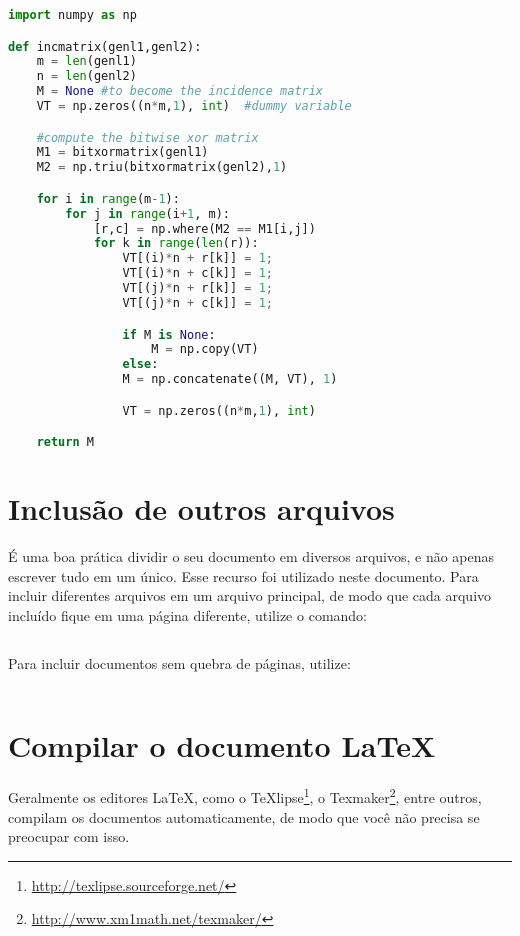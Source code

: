 \begin{lstlisting}[language=Python, caption=Python example]
import numpy as np

def incmatrix(genl1,genl2):
	m = len(genl1)
	n = len(genl2)
	M = None #to become the incidence matrix
	VT = np.zeros((n*m,1), int)  #dummy variable

	#compute the bitwise xor matrix
	M1 = bitxormatrix(genl1)
	M2 = np.triu(bitxormatrix(genl2),1)

	for i in range(m-1):
		for j in range(i+1, m):
			[r,c] = np.where(M2 == M1[i,j])
			for k in range(len(r)):
				VT[(i)*n + r[k]] = 1;
				VT[(i)*n + c[k]] = 1;
				VT[(j)*n + r[k]] = 1;
				VT[(j)*n + c[k]] = 1;

				if M is None:
					M = np.copy(VT)
				else:
				M = np.concatenate((M, VT), 1)

				VT = np.zeros((n*m,1), int)

	return M
\end{lstlisting}




\section{Inclusão de outros arquivos}\label{sec-include}

É uma boa prática dividir o seu documento em diversos arquivos, e não
apenas escrever tudo em um único. Esse recurso foi utilizado neste
documento. Para incluir diferentes arquivos em um arquivo principal,
de modo que cada arquivo incluído fique em uma página diferente, utilize o
comando:

\begin{lstlisting}[language=tex]
         % sem a extensão .tex
\end{lstlisting}

Para incluir documentos sem quebra de páginas, utilize:

\begin{lstlisting}[language=tex]
         % sem a extensão .tex
\end{lstlisting}

\section{Compilar o documento \LaTeX}

\showfont

Geralmente os editores \LaTeX, como o
TeXlipse\footnote{\url{http://texlipse.sourceforge.net/}}, o
Texmaker\footnote{\url{http://www.xm1math.net/texmaker/}}, entre outros,
compilam os documentos automaticamente, de modo que você não precisa se
preocupar com isso.

